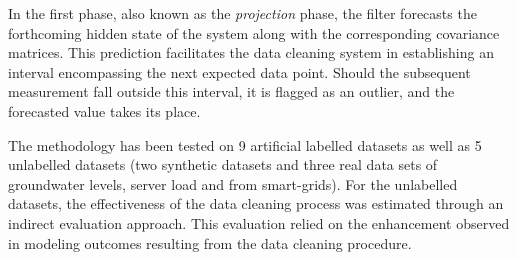 In the first phase, also known as the \textit{projection} phase, the filter forecasts the forthcoming hidden state of the system along with the corresponding covariance matrices. 
This prediction facilitates the data cleaning system in establishing an interval encompassing the next expected data point.
Should the subsequent measurement fall outside this interval, it is flagged as an outlier, and the forecasted value takes its place.

The methodology has been tested on 9 artificial labelled datasets as well as 5 unlabelled datasets (two synthetic datasets and three real data sets of groundwater levels, server load and from smart-grids).
For the unlabelled datasets, the effectiveness of the data cleaning process was estimated through an indirect evaluation approach. 
This evaluation relied on the enhancement observed in modeling outcomes resulting from the data cleaning procedure.


